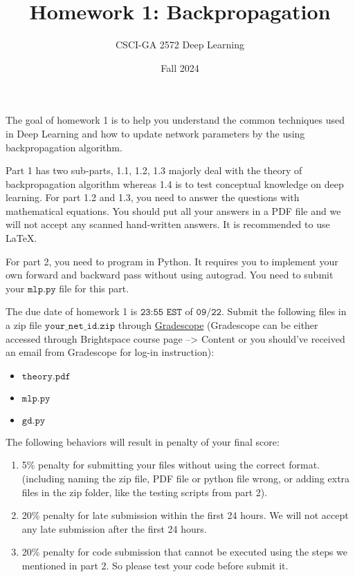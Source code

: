 \documentclass{article}
\title{Homework 1: Backpropagation}
\author{CSCI-GA 2572 Deep Learning}
\date{Fall 2024}
\begin{document}
\maketitle


The goal of homework 1 is to help you understand the common techniques used in Deep Learning and how to update network parameters by the using backpropagation algorithm.

Part 1 has two sub-parts, 1.1, 1.2, 1.3 majorly deal with the theory of backpropagation algorithm whereas 1.4 is to test conceptual knowledge on deep learning. For part 1.2 and 1.3, you need to answer the questions with mathematical equations. You should put all your answers in a PDF file and we will not accept any scanned hand-written answers. It is recommended to use \LaTeX.

For part 2, you need to program in Python. It requires you to implement your own forward and backward pass without using autograd. You need to submit your $\texttt{mlp.py}$ file for this part.

The due date of homework 1 is $\texttt{23:55 EST}$ of $\texttt{09/22}$.
Submit the following files in a zip file $\texttt{your\_net\_id.zip}$ through \href{https://www.gradescope.com}{Gradescope} (Gradescope can be either accessed through Brightspace course page --> Content or you should've received an email from Gradescope for log-in instruction):
\begin{itemize}
\item $\texttt{theory.pdf}$
\item $\texttt{mlp.py}$
\item $\texttt{gd.py}$
\end{itemize}

The following behaviors will result in penalty of your final score:
\begin{enumerate}
\item 5\% penalty for submitting your files without using the correct format. (including naming the zip file, PDF file or python file wrong, or adding extra files in the zip folder, like the testing scripts from part 2). 
\item 20\% penalty for late submission within the first 24 hours. We will not accept any late submission after the first 24 hours.
\item 20\% penalty for code submission that cannot be executed using the steps we mentioned in part 2.
So please test your code before submit it.
\end{enumerate}
\end{document}
